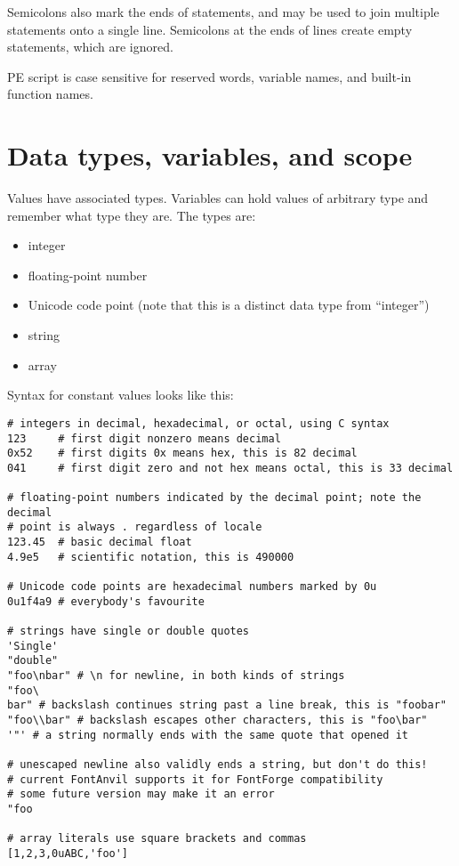 Semicolons also mark the ends of statements, and may be used to join
multiple statements onto a single line.  Semicolons at the ends of lines
create empty statements, which are ignored.

\begin{framed}
PE script is case sensitive for reserved words, variable names,
and built-in function names.
\end{framed}

\section{Data types, variables, and scope}

Values have associated types.  Variables can hold values of arbitrary type
and remember what type they are.  The types are:
\begin{itemize}
\item integer
\item floating-point number
\item Unicode code point (note that this is a distinct data type from
``integer'')
\item string
\item array
\end{itemize}

Syntax for constant values looks like this:
\begin{verbatim}
# integers in decimal, hexadecimal, or octal, using C syntax
123     # first digit nonzero means decimal
0x52    # first digits 0x means hex, this is 82 decimal
041     # first digit zero and not hex means octal, this is 33 decimal

# floating-point numbers indicated by the decimal point; note the decimal
# point is always . regardless of locale
123.45  # basic decimal float
4.9e5   # scientific notation, this is 490000

# Unicode code points are hexadecimal numbers marked by 0u
0u1f4a9 # everybody's favourite

# strings have single or double quotes
'Single'
"double"
"foo\nbar" # \n for newline, in both kinds of strings
"foo\
bar" # backslash continues string past a line break, this is "foobar"
"foo\\bar" # backslash escapes other characters, this is "foo\bar" 
'"' # a string normally ends with the same quote that opened it

# unescaped newline also validly ends a string, but don't do this!
# current FontAnvil supports it for FontForge compatibility
# some future version may make it an error
"foo

# array literals use square brackets and commas
[1,2,3,0uABC,'foo']
\end{verbatim}

